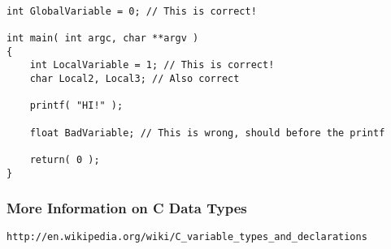 \documentclass[10pt,a4paper]{paper}
\begin{document}
\begin{lstlisting}

int GlobalVariable = 0; // This is correct!

int main( int argc, char **argv )
{
	int LocalVariable = 1; // This is correct!
	char Local2, Local3; // Also correct
	
	printf( "HI!" );
	
	float BadVariable; // This is wrong, should before the printf

	return( 0 );
}
\end{lstlisting}

\subsubsection*{More Information on C Data Types}
\begin{verbatim}
http://en.wikipedia.org/wiki/C_variable_types_and_declarations
\end{verbatim}
\end{document}
